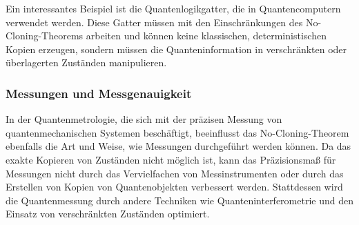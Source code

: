 Ein interessantes Beispiel ist die Quantenlogikgatter, die in Quantencomputern verwendet werden.
Diese Gatter müssen mit den Einschränkungen des No-Cloning-Theorems arbeiten und können keine klassischen,
deterministischen Kopien erzeugen, sondern müssen die Quanteninformation in verschränkten oder überlagerten Zuständen manipulieren.

\subsubsection{Messungen und Messgenauigkeit}
In der Quantenmetrologie, die sich mit der präzisen Messung von quantenmechanischen Systemen beschäftigt,
beeinflusst das No-Cloning-Theorem ebenfalls die Art und Weise, wie Messungen durchgeführt werden können.
Da das exakte Kopieren von Zuständen nicht möglich ist, kann das Präzisionsmaß für Messungen nicht durch das
Vervielfachen von Messinstrumenten oder durch das Erstellen von Kopien von Quantenobjekten verbessert werden.
Stattdessen wird die Quantenmessung durch andere Techniken wie
Quanteninterferometrie und den Einsatz von verschränkten Zuständen optimiert.



